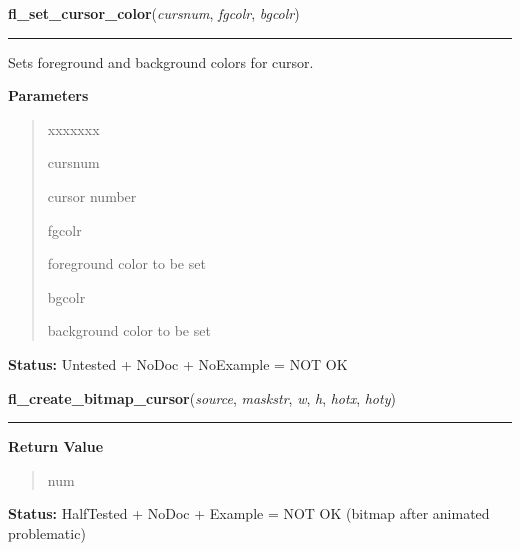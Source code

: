 \hspace{.8\funcindent}\begin{boxedminipage}{\funcwidth}

    \raggedright \textbf{fl\_set\_cursor\_color}(\textit{cursnum}, \textit{fgcolr}, \textit{bgcolr})

    \vspace{-1.5ex}

    \rule{\textwidth}{0.5\fboxrule}
\setlength{\parskip}{2ex}
    Sets foreground and background colors for cursor.

\setlength{\parskip}{1ex}
      \textbf{Parameters}
      \vspace{-1ex}

      \begin{quote}
        \begin{Ventry}{xxxxxxx}

          \item[cursnum]

          cursor number

          \item[fgcolr]

          foreground color to be set

          \item[bgcolr]

          background color to be set

        \end{Ventry}

      \end{quote}

\textbf{Status:} Untested + NoDoc + NoExample = NOT OK



    \end{boxedminipage}

    \label{xformslib:library:fl_create_bitmap_cursor}

    \vspace{0.5ex}

\hspace{.8\funcindent}\begin{boxedminipage}{\funcwidth}

    \raggedright \textbf{fl\_create\_bitmap\_cursor}(\textit{source}, \textit{maskstr}, \textit{w}, \textit{h}, \textit{hotx}, \textit{hoty})

    \vspace{-1.5ex}

    \rule{\textwidth}{0.5\fboxrule}
\setlength{\parskip}{2ex}
\setlength{\parskip}{1ex}
      \textbf{Return Value}
    \vspace{-1ex}

      \begin{quote}
      num

      \end{quote}

\textbf{Status:} HalfTested + NoDoc + Example = NOT OK (bitmap after animated problematic)



    \end{boxedminipage}

